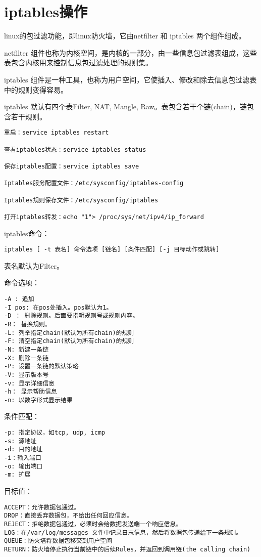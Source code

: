 \section{iptables操作}
linux的包过滤功能，即linux防火墙，它由netfilter 和 iptables 两个组件组成。

netfilter 组件也称为内核空间，是内核的一部分，由一些信息包过滤表组成，这些表包含内核用来控制信息包过滤处理的规则集。

iptables 组件是一种工具，也称为用户空间，它使插入、修改和除去信息包过滤表中的规则变得容易。

iptables 默认有四个表Filter, NAT, Mangle, Raw。表包含若干个链(chain)，链包含若干规则。

\begin{verbatim}
重启：service iptables restart

查看iptables状态：service iptables status

保存iptables配置：service iptables save

Iptables服务配置文件：/etc/sysconfig/iptables-config

Iptables规则保存文件：/etc/sysconfig/iptables

打开iptables转发：echo "1"> /proc/sys/net/ipv4/ip_forward

\end{verbatim}

iptables命令：
\begin{verbatim}
iptables [ -t 表名] 命令选项 [链名] [条件匹配] [-j 目标动作或跳转] 
\end{verbatim}
表名默认为Filter。

命令选项：
\begin{verbatim}
-A : 追加
-I pos: 在pos处插入。pos默认为1。
-D ： 删除规则。后面要指明规则号或规则内容。
-R： 替换规则。
-L: 列举指定chain(默认为所有chain)的规则
-F: 清空指定chain(默认为所有chain)的规则
-N: 新建一条链
-X: 删除一条链
-P: 设置一条链的默认策略
-V: 显示版本号
-v: 显示详细信息
-h： 显示帮助信息
-n: 以数字形式显示结果
\end{verbatim}

条件匹配：
\begin{verbatim}
-p: 指定协议，如tcp, udp, icmp
-s: 源地址
-d: 目的地址
-i：输入端口
-o: 输出端口
-m: 扩展
\end{verbatim}

目标值：
\begin{verbatim}
ACCEPT：允许数据包通过。 
DROP：直接丢弃数据包，不给出任何回应信息。 
REJECT：拒绝数据包通过，必须时会给数据发送端一个响应信息。 
LOG：在/var/log/messages 文件中记录日志信息，然后将数据包传递给下一条规则。 
QUEUE：防火墙将数据包移交到用户空间 
RETURN：防火墙停止执行当前链中的后续Rules，并返回到调用链(the calling chain) 
\end{verbatim}



